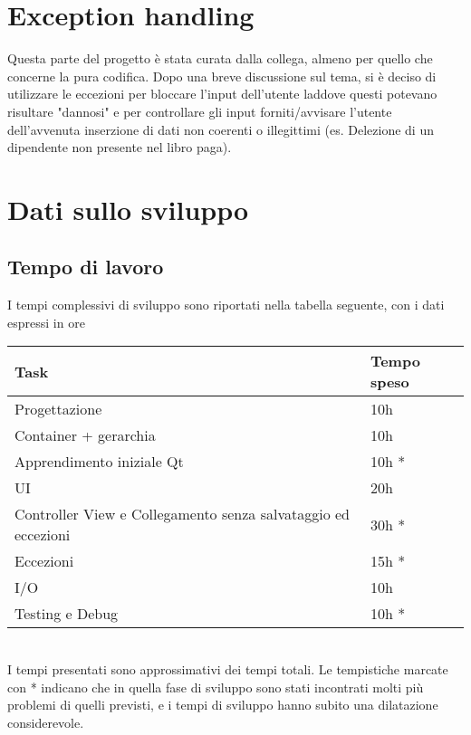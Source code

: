 \documentclass[a4paper,10pt]{article}
\begin{document}
\section{Exception handling}
Questa parte del progetto è stata curata dalla collega, almeno per quello che concerne la pura codifica. Dopo una breve discussione sul tema, si è deciso di utilizzare le eccezioni per bloccare l'input dell'utente laddove questi potevano risultare "dannosi" e per controllare gli input forniti/avvisare l'utente dell'avvenuta inserzione di dati non coerenti o illegittimi (es. Delezione di un dipendente non presente nel libro paga).

\section{Dati sullo sviluppo}
\subsection{Tempo di lavoro}

I tempi complessivi di sviluppo sono riportati nella tabella seguente, con i dati espressi in ore \\

\begin{tabular}{| l | l |}
\hline
\textbf{Task} & \textbf{Tempo speso} \\
\hline
Progettazione & 10h \\
\hline
Container + gerarchia & 10h \\
\hline
Apprendimento iniziale Qt & 10h *  \\
\hline
UI & 20h   \\
\hline
Controller View e Collegamento senza salvataggio ed eccezioni & 30h * \\
\hline
Eccezioni & 15h *  \\
\hline
I/O & 10h  \\
\hline
Testing e Debug & 10h * \\
\hline
\end{tabular} \\

I tempi presentati sono approssimativi dei tempi totali. Le tempistiche marcate con * indicano che in quella fase di sviluppo sono stati incontrati molti più problemi di quelli previsti, e i tempi di sviluppo hanno subito una dilatazione considerevole.
\end{document}
